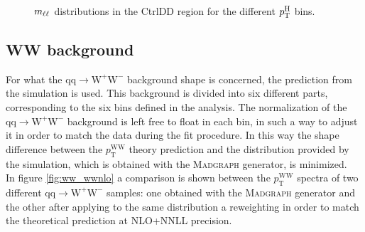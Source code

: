 \begin{figure}[htb]
\caption{$m_{\ell\ell}$ distributions in the CtrlDD region for the different $p_\mathrm{T}^\mathrm{H}$ bins.\label{fig:mllCtrlDD}}
\end{figure}

























\clearpage
\subsection{WW background \label{sec:WWBackground}}

For what the $\mathrm{qq\to W^{+}W^{-}}$ background shape is concerned, the prediction from the simulation is used.
This background is divided into six different parts, corresponding to the six \pth bins defined in the analysis. The normalization of the $\mathrm{qq\to W^{+}W^{-}}$ background is left free to float in each bin, in such a way to adjust it in order to match the data during the fit procedure. In this way the shape difference between the $p_\mathrm{T}^\mathrm{WW}$ theory prediction and the distribution provided by the simulation, which is obtained with the \textsc{Madgraph} generator, is minimized.\\
In figure \ref{fig:ww_wwnlo} a comparison is shown between the $p_\mathrm{T}^\mathrm{WW}$ spectra of two different $\mathrm{qq\to W^{+}W^{-}}$ samples: one obtained with the \textsc{Madgraph} generator and the other after applying to the same distribution a reweighting in order to match the theoretical prediction at NLO+NNLL precision.

